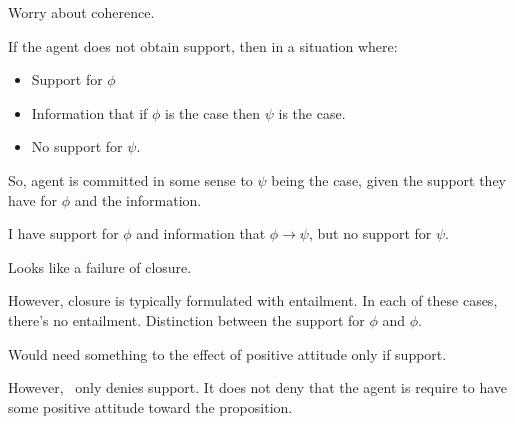 \begin{note}[Denying~\nI{}]
  Worry about coherence.

  If the agent does not obtain support, then in a situation where:
  \begin{itemize}
  \item Support for \(\phi\)
  \item Information that if \(\phi\) is the case then \(\psi\) is the case.
  \item No support for \(\psi\).
  \end{itemize}

  So, agent is committed in some sense to \(\psi\) being the case, given the support they have for \(\phi\) and the information.

  I have support for \(\phi\) and information that \(\phi \rightarrow \psi\), but no support for \(\psi\).

  Looks like a failure of closure.

  However, closure is typically formulated with entailment.
  In each of these cases, there's no entailment.
  Distinction between the support for \(\phi\) and \(\phi\).

  Would need something to the effect of positive attitude only if support.

  However,~\nI{} only denies support.
  It does not deny that the agent is require to have some positive attitude toward the proposition.
\end{note}

